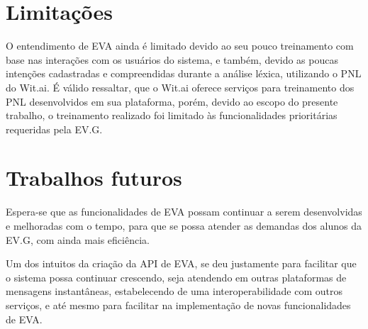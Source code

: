 \section{Limitações}

O entendimento de EVA ainda é limitado devido ao seu pouco treinamento com base nas interações com os usuários do sistema, e também, devido as poucas intenções cadastradas e compreendidas durante a análise léxica, utilizando o PNL do Wit.ai. É válido ressaltar, que o Wit.ai oferece serviços para treinamento dos PNL desenvolvidos em sua plataforma, porém, devido ao escopo do presente trabalho, o treinamento realizado foi limitado às funcionalidades prioritárias requeridas pela EV.G.

\section{Trabalhos futuros}

Espera-se que as funcionalidades de EVA possam continuar a serem desenvolvidas e melhoradas com o tempo, para que se possa atender as demandas dos alunos da EV.G, com ainda mais eficiência.

Um dos intuitos da criação da API de EVA, se deu justamente para facilitar que o sistema possa continuar crescendo, seja atendendo em outras plataformas de mensagens instantâneas, estabelecendo de uma interoperabilidade com outros serviços, e até mesmo para facilitar na implementação de novas funcionalidades de EVA. 
